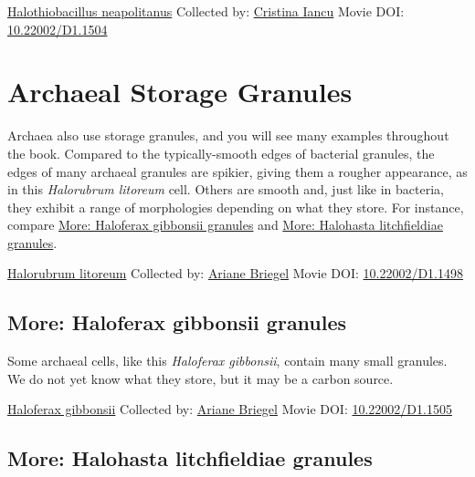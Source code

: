 \documentclass[]{tufte-book}
\begin{document}
\label{fig:4-9b}\protect\hyperlink{tree}{Halothiobacillus neapolitanus} Collected by: \protect\hyperlink{cristina_iancu}{Cristina Iancu} Movie DOI: \href{https://doi.org/10.22002/D1.1504}{10.22002/D1.1504}

\hypertarget{archaeal-storage-granules}{%
\section{Archaeal Storage Granules}\label{archaeal-storage-granules}}

Archaea also use storage granules, and you will see many examples throughout the book. Compared to the typically-smooth edges of bacterial granules, the edges of many archaeal granules are spikier, giving them a rougher appearance, as in this \emph{Halorubrum litoreum} cell. Others are smooth and, just like in bacteria, they exhibit a range of morphologies depending on what they store. For instance, compare \protect\hyperlink{Haloferax_gibbonsii_granules}{More: Haloferax gibbonsii granules} and \protect\hyperlink{Halohasta_litchfieldiae_granules}{More: Halohasta litchfieldiae granules}.



\hypertarget{htmlwidget-f83eb55de6ecd9b2ed3f}{}

\label{fig:4-10}\protect\hyperlink{tree}{Halorubrum litoreum} Collected by: \protect\hyperlink{ariane_briegel}{Ariane Briegel} Movie DOI: \href{https://doi.org/10.22002/D1.1498}{10.22002/D1.1498}

\hypertarget{Haloferax_gibbonsii_granules}{%
\subsection*{More: Haloferax gibbonsii granules}\label{Haloferax_gibbonsii_granules}}

Some archaeal cells, like this \emph{Haloferax gibbonsii}, contain many small granules. We do not yet know what they store, but it may be a carbon source.



\hypertarget{htmlwidget-99b6e146b6b01b7b1899}{}

\label{fig:4-10a}\protect\hyperlink{tree}{Haloferax gibbonsii} Collected by: \protect\hyperlink{ariane_briegel}{Ariane Briegel} Movie DOI: \href{https://doi.org/10.22002/D1.1505}{10.22002/D1.1505}

\hypertarget{Halohasta_litchfieldiae_granules}{%
\subsection*{More: Halohasta litchfieldiae granules}\label{Halohasta_litchfieldiae_granules}}
\end{document}

